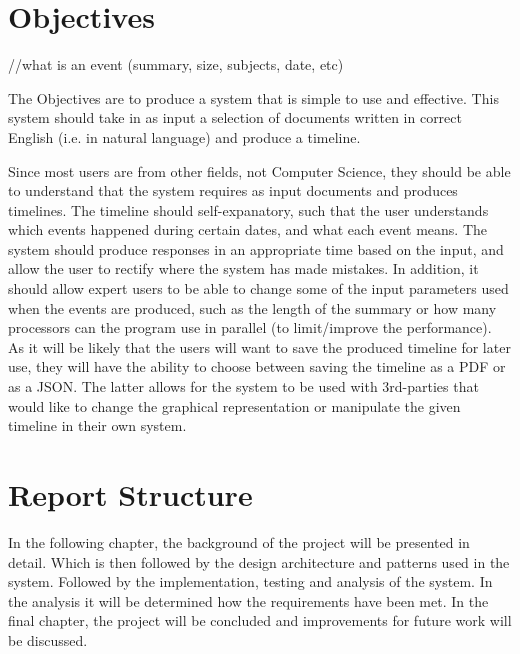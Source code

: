 \documentclass[11pt]{informatics-report}
\begin{document}
\section{Objectives}
//what is an event (summary, size, subjects, date, etc)
\par The Objectives are to produce a system that is simple to use and effective. This system should take in as input a selection of documents written in correct English (i.e. in natural language) and produce a timeline.
\par Since most users are from other fields, not Computer Science, they should be able to understand that the system requires as input documents and produces timelines. The timeline should self-expanatory, such that the user understands which events happened during certain dates, and what each event means. The system should produce responses in an appropriate time based on the input, and allow the user to rectify where the system has made mistakes. In addition, it should allow expert users to be able to change some of the input parameters used when the events are produced, such as the length of the summary or how many processors can the program use in parallel (to limit/improve the performance). As it will be likely that the users will want to save the produced timeline for later use, they will have the ability to choose between saving the timeline as a PDF or as a JSON. The latter allows for the system to be used with 3rd-parties that would like to change the graphical representation or manipulate the given timeline in their own system.
\section{Report Structure}
In the following chapter, the background of the project will be presented in detail. Which is then followed by the design architecture and patterns used in the system. Followed by the implementation, testing and analysis of the system. In the analysis it will be determined how the requirements have been met. In the final chapter, the project will be concluded and improvements for future work will be discussed.














\appendix



\end{document}
